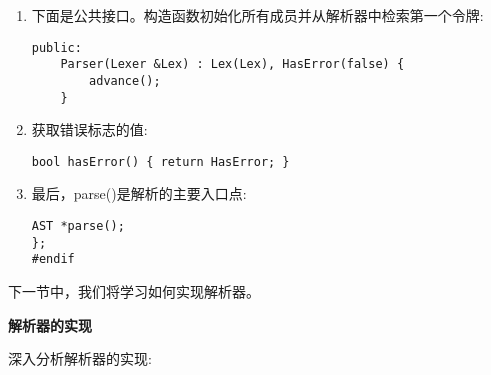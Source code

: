\begin{enumerate}
\item 下面是公共接口。构造函数初始化所有成员并从解析器中检索第一个令牌:
\begin{lstlisting}[caption={}]
	public:
	Parser(Lexer &Lex) : Lex(Lex), HasError(false) {
		advance();
	}
\end{lstlisting}

\item 获取错误标志的值:
\begin{lstlisting}[caption={}]
	bool hasError() { return HasError; }
\end{lstlisting}

\item 最后，parse()是解析的主要入口点:
\begin{lstlisting}[caption={}]
	AST *parse();
};
#endif
\end{lstlisting}
	
\end{enumerate}

下一节中，我们将学习如何实现解析器。\par

\hspace*{\fill} \par %
\textbf{解析器的实现}

深入分析解析器的实现:\par

